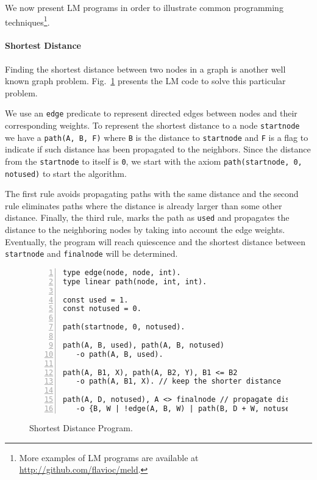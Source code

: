 
We now present LM programs in order to illustrate common programming techniques\footnote{More examples of LM programs are available at \url{http://github.com/flavioc/meld}.}.

\paragraph{Shortest Distance}

Finding the shortest distance between two nodes in a graph is another well known graph problem.
Fig.~\ref{code:shortest_path} presents the LM code to solve this particular problem.

We use an \texttt{edge}
predicate to represent directed edges between nodes and their corresponding weights. To represent the shortest
distance to a node \texttt{startnode} we have a \texttt{path(A, B, F)} where \texttt{B} is the distance to \texttt{startnode}
and \texttt{F} is a flag to indicate if such distance has been propagated to the neighbors. Since the distance from
the \texttt{startnode} to itself is \texttt{0}, we start with the axiom \texttt{path(startnode, 0, notused)} to start the algorithm.

The first rule avoids propagating paths with the same distance and the second rule eliminates paths where the distance
is already larger than some other distance. Finally, the third rule, marks the path as \texttt{used} and propagates
the distance to the neighboring nodes by taking into account the edge weights.
Eventually, the program will reach quiescence and the shortest distance between \texttt{startnode} and \texttt{finalnode}
will be determined.

\newcommand{\BigO}[1]{\ensuremath{\operatorname{O}\bigl(#1\bigr)}}

\begin{figure}[h]
\scriptsize\begin{Verbatim}[numbers=left]
type edge(node, node, int).
type linear path(node, int, int).

const used = 1.
const notused = 0.

path(startnode, 0, notused).

path(A, B, used), path(A, B, notused)
   -o path(A, B, used).

path(A, B1, X), path(A, B2, Y), B1 <= B2
   -o path(A, B1, X). // keep the shorter distance

path(A, D, notused), A <> finalnode // propagate distance
   -o {B, W | !edge(A, B, W) | path(B, D + W, notused)}, path(A, D, used).
\end{Verbatim}
\caption{Shortest Distance Program.}
\label{code:shortest_path}
\end{figure}
\normalsize


